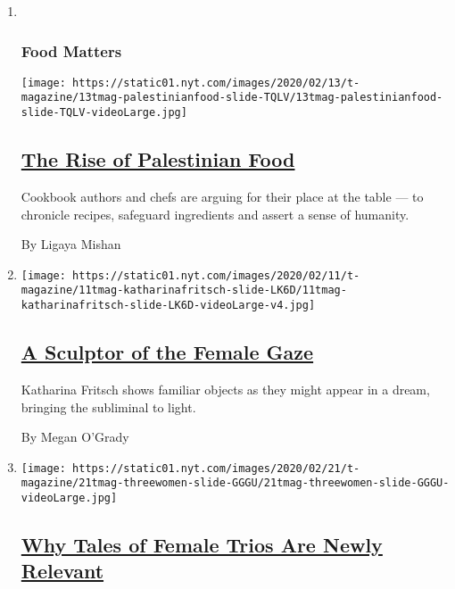 \begin{enumerate}
\def\labelenumi{\arabic{enumi}.}
\item ~
  \hypertarget{food-matters}{%
  \subsubsection{Food Matters}\label{food-matters}}

  \texttt{[image: https://static01.nyt.com/images/2020/02/13/t-magazine/13tmag-palestinianfood-slide-TQLV/13tmag-palestinianfood-slide-TQLV-videoLarge.jpg]}

  \hypertarget{the-rise-of-palestinian-food}{%
  \subsection{\texorpdfstring{\href{/2020/02/12/t-magazine/palestinian-food.html}{The
  Rise of Palestinian
  Food}}{The Rise of Palestinian Food}}\label{the-rise-of-palestinian-food}}

  Cookbook authors and chefs are arguing for their place at the table
  --- to chronicle recipes, safeguard ingredients and assert a sense of
  humanity.

  By Ligaya Mishan
\item
  \texttt{[image: https://static01.nyt.com/images/2020/02/11/t-magazine/11tmag-katharinafritsch-slide-LK6D/11tmag-katharinafritsch-slide-LK6D-videoLarge-v4.jpg]}

  \hypertarget{a-sculptor-of-the-female-gaze}{%
  \subsection{\texorpdfstring{\href{/2020/02/12/t-magazine/katharina-fritsch-artist.html}{A
  Sculptor of the Female
  Gaze}}{A Sculptor of the Female Gaze}}\label{a-sculptor-of-the-female-gaze}}

  Katharina Fritsch shows familiar objects as they might appear in a
  dream, bringing the subliminal to light.

  By Megan O'Grady
\item
  \texttt{[image: https://static01.nyt.com/images/2020/02/21/t-magazine/21tmag-threewomen-slide-GGGU/21tmag-threewomen-slide-GGGU-videoLarge.jpg]}

  \hypertarget{why-tales-of-female-trios-are-newly-relevant}{%
  \subsection{\texorpdfstring{\href{/2020/02/19/t-magazine/female-trios.html}{Why
  Tales of Female Trios Are Newly
  Relevant}}{Why Tales of Female Trios Are Newly Relevant}}\label{why-tales-of-female-trios-are-newly-relevant}}


\end{enumerate}
